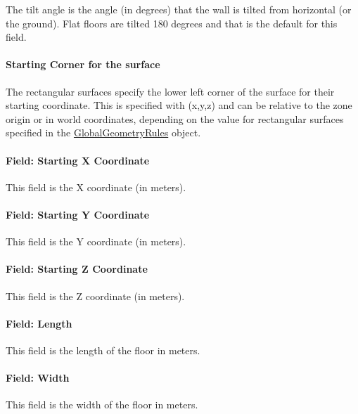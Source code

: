 The tilt angle is the angle (in degrees) that the wall is tilted from horizontal (or the ground). Flat floors are tilted 180 degrees and that is the default for this field.

\paragraph{Starting Corner for the surface}\label{starting-corner-for-the-surface-8}

The rectangular surfaces specify the lower left corner of the surface for their starting coordinate. This is specified with (x,y,z) and can be relative to the zone origin or in world coordinates, depending on the value for rectangular surfaces specified in the \hyperref[globalgeometryrules]{GlobalGeometryRules} object.

\paragraph{Field: Starting X Coordinate}\label{field-starting-x-coordinate-8}

This field is the X coordinate (in meters).

\paragraph{Field: Starting Y Coordinate}\label{field-starting-y-coordinate-8}

This field is the Y coordinate (in meters).

\paragraph{Field: Starting Z Coordinate}\label{field-starting-z-coordinate-8}

This field is the Z coordinate (in meters).

\paragraph{Field: Length}\label{field-length-8}

This field is the length of the floor in meters.

\paragraph{Field: Width}\label{field-width-4}

This field is the width of the floor in meters.

